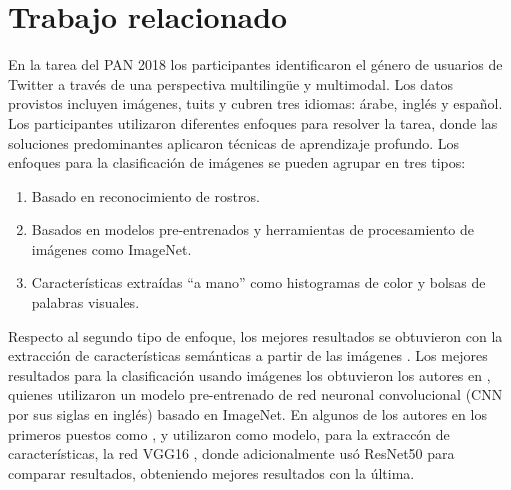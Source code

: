 \documentclass[runningheads]{llncs}
\begin{document}
\section{Trabajo relacionado}

En la tarea del PAN 2018 los participantes identificaron el género
de usuarios de Twitter a través de una perspectiva multilingüe y multimodal. Los
datos provistos incluyen imágenes, tuits y cubren tres idiomas: árabe, inglés y
español. Los participantes utilizaron diferentes enfoques para resolver la tarea,
donde las soluciones predominantes aplicaron técnicas de aprendizaje profundo.
Los enfoques para la clasificación de imágenes se pueden agrupar en tres tipos:
\begin{enumerate}
    \item Basado en reconocimiento de rostros.
    \item Basados en modelos pre-entrenados y herramientas de procesamiento de
    imágenes como ImageNet.
    \item Características extraídas ``a mano'' como histogramas de color y bolsas 
    de palabras visuales.
\end{enumerate}

Respecto al segundo tipo de enfoque, los mejores resultados se obtuvieron 
con la extracción de características semánticas a partir de las 
imágenes \cite{rangel_rosso_montes-y-gomez_potthast_stein}.
Los mejores resultados para la clasificación usando imágenes los obtuvieron los
autores en \cite{takahashi_tahara_nagatan_miura_taniguchi_ohkuma}, quienes utilizaron 
un modelo pre-entrenado de red neuronal convolucional (CNN por sus siglas en inglés) 
basado en ImageNet. En algunos de los autores en los primeros puestos como \cite{aragon2018straightforward}, 
\cite{takahashi_tahara_nagatan_miura_taniguchi_ohkuma} y \cite{sierra_gonzales} utilizaron como modelo, para la extraccón de características, la red VGG16 \cite{zisserman_simonyan_2015}, donde \cite{sierra_gonzales} adicionalmente usó ResNet50 \cite{7780459} para comparar resultados, obteniendo mejores resultados con la última.
\end{document}
